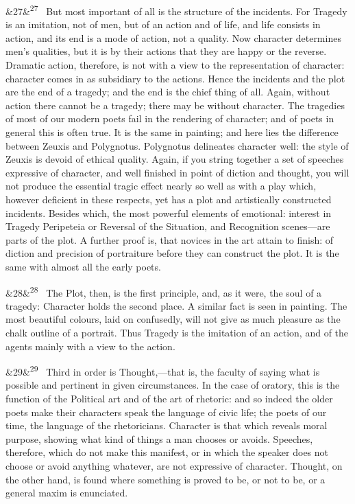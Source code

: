 \documentclass[12pt]{article}
\newcommand{\para}[1][]{\par\noindent\ifx&#1&\else\textsuperscript{\footnotesize #1}~\fi}
\begin{document}
\para[27] But most important of all is the structure of the incidents. For Tragedy is an imitation, not of men, but of an action and of life, and life consists in action, and its end is a mode of action, not a quality. Now character determines men's qualities, but it is by their actions that they are happy or the reverse. Dramatic action, therefore, is not with a view to the representation of character: character comes in as subsidiary to the actions. Hence the incidents and the plot are the end of a tragedy; and the end is the chief thing of all. Again, without action there cannot be a tragedy; there may be without character. The tragedies of most of our modern poets fail in the rendering of character; and of poets in general this is often true. It is the same in painting; and here lies the difference between Zeuxis and Polygnotus. Polygnotus delineates character well: the style of Zeuxis is devoid of ethical quality. Again, if you string together a set of speeches expressive of character, and well finished in point of diction and thought, you will not produce the essential tragic effect nearly so well as with a play which, however deficient in these respects, yet has a plot and artistically constructed incidents. Besides which, the most powerful elements of emotional: interest in Tragedy Peripeteia or Reversal of the Situation, and Recognition scenes---are parts of the plot. A further proof is, that novices in the art attain to finish: of diction and precision of portraiture before they can construct the plot. It is the same with almost all the early poets.

\para[28] The Plot, then, is the first principle, and, as it were, the soul of a tragedy: Character holds the second place. A similar fact is seen in painting. The most beautiful colours, laid on confusedly, will not give as much pleasure as the chalk outline of a portrait. Thus Tragedy is the imitation of an action, and of the agents mainly with a view to the action.

\para[29] Third in order is Thought,---that is, the faculty of saying what is possible and pertinent in given circumstances. In the case of oratory, this is the function of the Political art and of the art of rhetoric: and so indeed the older poets make their characters speak the language of civic life; the poets of our time, the language of the rhetoricians. Character is that which reveals moral purpose, showing what kind of things a man chooses or avoids. Speeches, therefore, which do not make this manifest, or in which the speaker does not choose or avoid anything whatever, are not expressive of character. Thought, on the other hand, is found where something is proved to be, or not to be, or a general maxim is enunciated.
\end{document}
